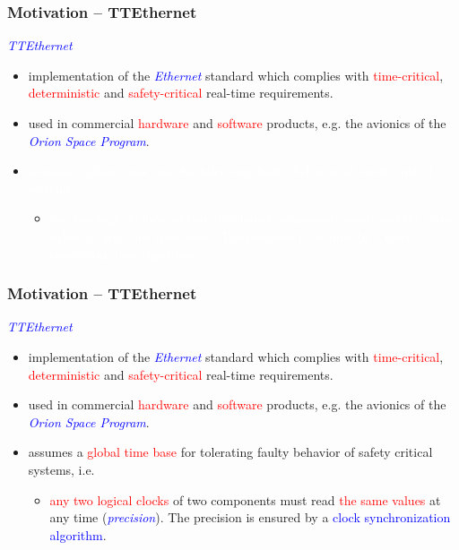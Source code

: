 \documentclass[serif]{beamer}
\begin{document}
\begin{frame}\frametitle{\textbf{Motivation -- TTEthernet}}
\emph{\textcolor{blue}{TTEthernet}}  
\begin{itemize}
\item implementation of the \emph{\textcolor{blue}{Ethernet}} standard which complies with
\textcolor{red}{time-critical}, \textcolor{red}{deterministic} and \textcolor{red}{safety-critical} real-time requirements.

\item used in commercial \textcolor{red}{hardware} and \textcolor{red}{software} products,
e.g. the avionics of the \emph{\textcolor{blue}{Orion Space Program}}.

\item[] \textcolor{white}{assumes a \textcolor{white}{global time base} for tolerating faulty behavior of safety critical systems.}
	\begin{itemize}
		\item[]  \textcolor{white}{any two logical clocks of two distributed
						components must read \textcolor{white}{the same values} at any time (\emph{\textcolor{white}{precision}}).
						The precision is ensured by a \textcolor{white}{clock synchronization algorithm}. }
	\end{itemize}
\end{itemize}
\end{frame} 


\begin{frame}\frametitle{\textbf{Motivation -- TTEthernet}}
\emph{\textcolor{blue}{TTEthernet}}  
\begin{itemize}
\item implementation of the \emph{\textcolor{blue}{Ethernet}} standard which complies with
\textcolor{red}{time-critical}, \textcolor{red}{deterministic} and \textcolor{red}{safety-critical} real-time requirements.

\item used in commercial \textcolor{red}{hardware} and \textcolor{red}{software} products,
e.g. the avionics of the \emph{\textcolor{blue}{Orion Space Program}}.

\item assumes a \textcolor{red}{global time base} for tolerating faulty behavior of safety critical systems, i.e.
	\begin{itemize}
		\item  \textcolor{red}{any two logical clocks} of two
						components must read \textcolor{red}{the same values} at any time (\emph{\textcolor{blue}{precision}}). 
						The precision is ensured by a \textcolor{blue}{clock synchronization algorithm}.
	\end{itemize}
\end{itemize}
\end{frame} 
 
\end{document}

